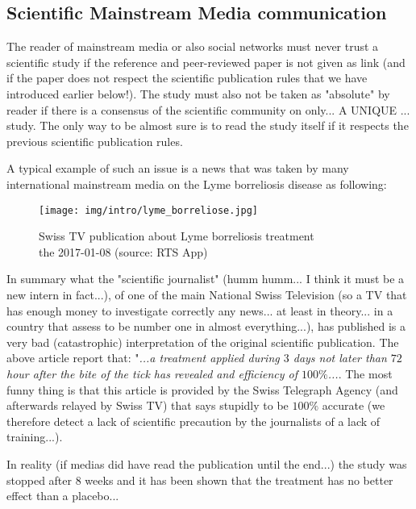 	\pagebreak
	\subsection{Scientific Mainstream Media communication}
	The reader of mainstream media or also social networks must never trust a scientific study if the reference and peer-reviewed paper is not given as link (and if the paper does not respect the scientific publication rules that we have introduced earlier below!). The study must also not be taken as "absolute" by reader if there is a consensus of the scientific community on only... A UNIQUE ... study. The only way to be almost sure is to read the study itself if it respects the previous scientific publication rules.
	
	A typical example of such an issue is a news that was taken by many international mainstream media on the Lyme borreliosis disease as following:
	\begin{figure}[H]
		\centering
		\texttt{[image: img/intro/lyme\_borreliose.jpg]}
		\caption[Swiss TV publication about Lyme borreliosis treatment]{Swiss TV publication about Lyme borreliosis treatment\\ the 2017-01-08 (source: RTS App)}
	\end{figure}
	In summary what the "scientific journalist" (humm humm... I think it must be a new intern in fact...), of one of the main National Swiss Television (so a TV that has enough money to investigate correctly any news... at least in theory... in a country that assess to be number one in almost everything...), has published is a very bad (catastrophic) interpretation of the original scientific publication. The above article report that: "\textit{...a treatment applied during $3$ days not later than $72$ hour after the bite of the tick has revealed and efficiency of $100\%$...}. The most funny thing is that this article is provided by the Swiss Telegraph Agency (and afterwards relayed by Swiss TV) that says stupidly to be $100\%$ accurate (we therefore detect a lack of scientific precaution by the journalists of a lack of training...).
	
	In reality (if medias did have read the publication until the end...) the study was stopped after $8$ weeks and it has been shown that the treatment has no better effect than a placebo...
	
